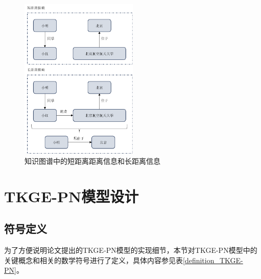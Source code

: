 \begin{figure}[htb]
    \centerline{\includegraphics[width=0.5\textwidth]{pic/long-term-dependency.pdf}}
    \caption{知识图谱中的短距离距离信息和长距离信息}
    \label{long-term-dependency}
  \end{figure}

\section{TKGE-PN模型设计}

\subsection{符号定义}
为了方便说明论文提出的TKGE-PN模型的实现细节，本节对TKGE-PN模型中的关键概念和相关的数学符号进行了定义，具体内容参见表\ref{definition_TKGE-PN}。

\setlength{\tabcolsep}{20pt}

